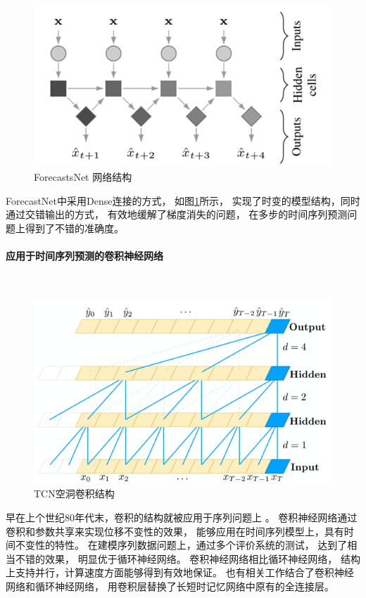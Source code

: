     \begin{figure}
      \centering
      \includegraphics[width=0.8\linewidth]{figures/ForecastsNet 网络结构.png}
      \caption{ForecastsNet 网络结构}
      \label{tab:ForecastsNet}
    \end{figure}

    ForecastNet\cite{dabrowski2020forecastnet}中采用Dense连接的方式，
    如图\ref{tab:ForecastsNet}所示，
    实现了时变的模型结构，同时通过交错输出的方式，
    有效地缓解了梯度消失的问题，
    在多步的时间序列预测问题上得到了不错的准确度。  
  
  \paragraph{应用于时间序列预测的卷积神经网络}~{}
  
    \begin{figure}
      \centering
      \includegraphics[width=0.8\linewidth]{figures/TCN空洞卷积结构.png}
      \caption{TCN空洞卷积结构}
      \label{tab:TCN}
    \end{figure}
    早在上个世纪80年代末，卷积的结构就被应用于序列问题上
    \cite{lecun1989backpropagation}。
    卷积神经网络通过卷积和参数共享来实现位移不变性的效果\cite{amari2003handbook}，
    能够应用在时间序列模型上，具有时间不变性的特性。
    在建模序列数据问题上，通过多个评价系统\cite{chung2014empirical}的测试，
    达到了相当不错的效果，
    明显优于循环神经网络\cite{binkowski2018autoregressive}。
    卷积神经网络相比循环神经网络，
    结构上支持并行，计算速度方面能够得到有效地保证。
    也有相关工作\cite{shi2015convolutional}结合了卷积神经网络和循环神经网络，
    用卷积层替换了长短时记忆网络中原有的全连接层。

